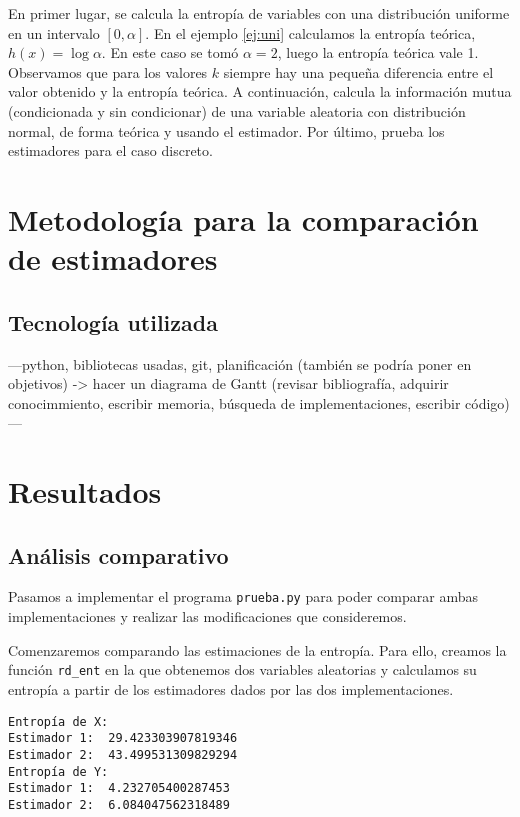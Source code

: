 \documentclass[10pt,a4paper]{article} %
\theoremstyle{definition}
\begin{document}
En primer lugar, se calcula la entropía de variables con una distribución uniforme en un intervalo $[0,\alpha]$. En el ejemplo \ref{ej:uni} calculamos la entropía teórica, $h(x) = \log \alpha$. En este caso se tomó $\alpha = 2$, luego la entropía teórica vale 1. Observamos que para los valores $k$ siempre hay una pequeña diferencia entre el valor obtenido y la entropía teórica. A continuación, calcula la información mutua (condicionada y sin condicionar) de una variable aleatoria con distribución normal, de forma teórica y usando el estimador. Por último, prueba los estimadores para el caso discreto. 


\section{Metodología para la comparación de estimadores}
\subsection{Tecnología utilizada}
---python, bibliotecas usadas, git, planificación (también se podría poner en objetivos) -> hacer un diagrama de Gantt (revisar bibliografía, adquirir conocimmiento, escribir memoria, búsqueda de implementaciones, escribir código)---


\section{Resultados}

\subsection{Análisis comparativo}

Pasamos a implementar el programa \texttt{prueba.py} para poder comparar ambas implementaciones y realizar las modificaciones que consideremos.

Comenzaremos comparando las estimaciones de la entropía. Para ello, creamos la función \texttt{rd\_ent} en la que obtenemos dos variables aleatorias y calculamos su entropía a partir de los estimadores dados por las dos implementaciones.

\begin{lstlisting}
Entropía de X:
Estimador 1:  29.423303907819346
Estimador 2:  43.499531309829294
Entropía de Y:
Estimador 1:  4.232705400287453
Estimador 2:  6.084047562318489
\end{lstlisting}
\end{document}
